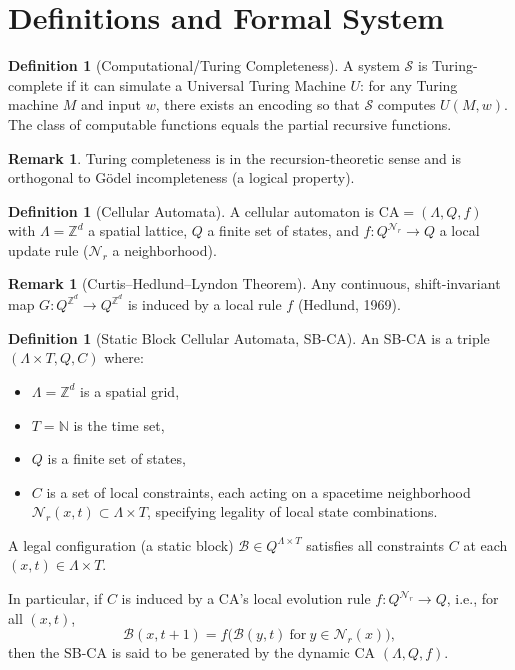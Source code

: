 \documentclass[12pt]{article}
\theoremstyle{plain}
\theoremstyle{definition}
\newtheorem{definition}[theorem]{Definition}
\newtheorem{remark}[theorem]{Remark}
\begin{document}
\section{Definitions and Formal System}

\begin{definition}[Computational/Turing Completeness]
A system $\mathcal{S}$ is Turing-complete if it can simulate a Universal Turing Machine $U$: for any Turing machine $M$ and input $w$, there exists an encoding so that $\mathcal{S}$ computes $U(M,w)$. The class of computable functions equals the partial recursive functions.
\end{definition}

\begin{remark}
Turing completeness is in the recursion-theoretic sense and is orthogonal to G\"{o}del incompleteness (a logical property).
\end{remark}

\begin{definition}[Cellular Automata]
A cellular automaton is $\mathrm{CA}=(\Lambda,Q,f)$ with $\Lambda=\mathbb{Z}^d$ a spatial lattice, $Q$ a finite set of states, and $f: Q^{\mathcal{N}_r} \to Q$ a local update rule ($\mathcal{N}_r$ a neighborhood).
\end{definition}

\begin{remark}[Curtis--Hedlund--Lyndon Theorem]
Any continuous, shift-invariant map $G:Q^{\mathbb{Z}^d}\to Q^{\mathbb{Z}^d}$ is induced by a local rule $f$ (Hedlund, 1969)\cite{hedlund1969}.
\end{remark}

\begin{definition}[Static Block Cellular Automata, SB-CA]
An SB-CA is a triple $(\Lambda\times T, Q, C)$ where:

\begin{itemize}
\item $\Lambda=\mathbb{Z}^d$ is a spatial grid,
\item $T=\mathbb{N}$ is the time set,
\item $Q$ is a finite set of states,
\item $C$ is a set of local constraints, each acting on a spacetime neighborhood $\mathcal{N}_r(x,t)\subset \Lambda\times T$, specifying legality of local state combinations.
\end{itemize}

A legal configuration (a static block) $\mathcal{B}\in Q^{\Lambda\times T}$ satisfies all constraints $C$ at each $(x,t)\in \Lambda\times T$.

In particular, if $C$ is induced by a CA's local evolution rule $f:Q^{\mathcal{N}_r}\to Q$, i.e., for all $(x,t)$,
\[
\mathcal{B}(x,t+1)=f\big(\mathcal{B}(y,t)\ \text{for}\ y\in\mathcal{N}_r(x)\big),
\]
then the SB-CA is said to be generated by the dynamic CA $(\Lambda,Q,f)$.
\end{definition}
\end{document}
